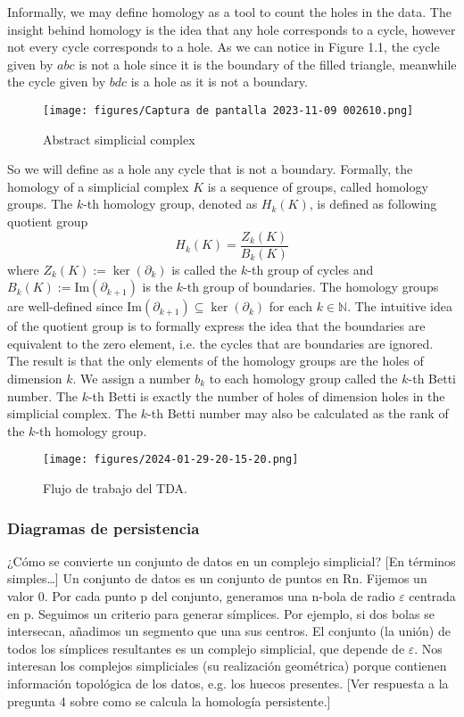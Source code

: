 \documentclass[a4paper,11pt]{article}
\begin{document}
Informally, we may define homology as a tool to count the holes in the data. The insight behind homology is the idea that any hole corresponds to a cycle, however not every cycle corresponds to a hole. As we can notice in Figure 1.1, the cycle given by $abc$ is not a hole since it is the boundary of the filled triangle, meanwhile the cycle given by $bdc$ is a hole as it is not a boundary.
    \begin{figure}[htbp!]
        \centering
        \texttt{[image: figures/Captura de pantalla 2023-11-09 002610.png]}
        \caption{Abstract simplicial complex}
        \label{fig:enter-label}
    \end{figure}
So we will define as a hole any cycle that is not a boundary. Formally, the homology of a simplicial complex $K$ is a sequence of groups, called homology groups. The $k$-th homology group, denoted as $H_k(K)$, is defined as following quotient group
$$ H_k(K)=\frac{Z_k(K)}{B_k(K)}$$
where $Z_k(K):=\ker(\partial_k)$ is called the $k$-th group of cycles and $B_k(K):=\text{Im}(\partial_{k+1})$ is the $k$-th group of boundaries. The homology groups are well-defined since $\text{Im}(\partial_{k+1})\subseteq \ker(\partial_k)$ for each $k\in\mathbb{N}$. The intuitive idea of the quotient group is to formally express the idea that the boundaries are equivalent to the zero element, i.e. the cycles that are boundaries are ignored. The result is that the only elements of the homology groups are the holes of dimension $k$. We assign a number $b_k$ to each homology group called the $k$-th Betti number. The $k$-th Betti is exactly the number of holes of dimension holes in the simplicial complex. The $k$-th Betti number may also be calculated as the rank of the $k$-th homology group.

\begin{figure}[!htb]
    \centering
    \texttt{[image: figures/2024-01-29-20-15-20.png]}
    \caption{Flujo  de trabajo del TDA.}%
\end{figure}





\subsubsection{Diagramas de persistencia}

¿Cómo se convierte un conjunto de datos en un complejo simplicial?
[En términos simples…] Un conjunto de datos es un conjunto de puntos en Rn. Fijemos un valor 0. Por cada punto p del conjunto, generamos una n-bola de radio \(\varepsilon\) centrada en p. Seguimos un criterio para generar símplices. Por ejemplo, si dos bolas se intersecan, añadimos un segmento que una sus centros. El conjunto (la unión) de todos los símplices resultantes es un complejo simplicial, que depende de \(\varepsilon\). Nos interesan los complejos simpliciales (su realización geométrica) porque contienen información topológica de los datos, e.g. los huecos presentes. [Ver respuesta a la pregunta 4 sobre como se calcula la homología persistente.]
\end{document}
